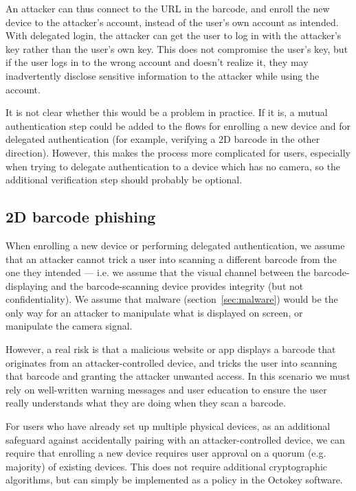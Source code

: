 An attacker can thus connect to the URL in the barcode, and enroll the new device to the attacker's
account, instead of the user's own account as intended. With delegated login, the attacker can get
the user to log in with the attacker's key rather than the user's own key. This does not compromise
the user's key, but if the user logs in to the wrong account and doesn't realize it, they may
inadvertently disclose sensitive information to the attacker while using the account.

It is not clear whether this would be a problem in practice. If it is, a mutual authentication step
could be added to the flows for enrolling a new device and for delegated authentication (for
example, verifying a 2D barcode in the other direction). However, this makes the process more
complicated for users, especially when trying to delegate authentication to a device which has no
camera, so the additional verification step should probably be optional.

\subsection{2D barcode phishing}\label{sec:barcode-phishing}

When enrolling a new device or performing delegated authentication, we assume that an attacker
cannot trick a user into scanning a different barcode from the one they intended --- i.e. we assume
that the visual channel between the barcode-displaying and the barcode-scanning device provides
integrity (but not confidentiality). We assume that malware (section~\ref{sec:malware}) would be the
only way for an attacker to manipulate what is displayed on screen, or manipulate the camera signal.

However, a real risk is that a malicious website or app displays a barcode that originates from an
attacker-controlled device, and tricks the user into scanning that barcode and granting the attacker
unwanted access. In this scenario we must rely on well-written warning messages and user education
to ensure the user really understands what they are doing when they scan a barcode.

For users who have already set up multiple physical devices, as an additional safeguard against
accidentally pairing with an attacker-controlled device, we can require that enrolling a new device
requires user approval on a quorum (e.g. majority) of existing devices. This does not require
additional cryptographic algorithms, but can simply be implemented as a policy in the Octokey
software.

